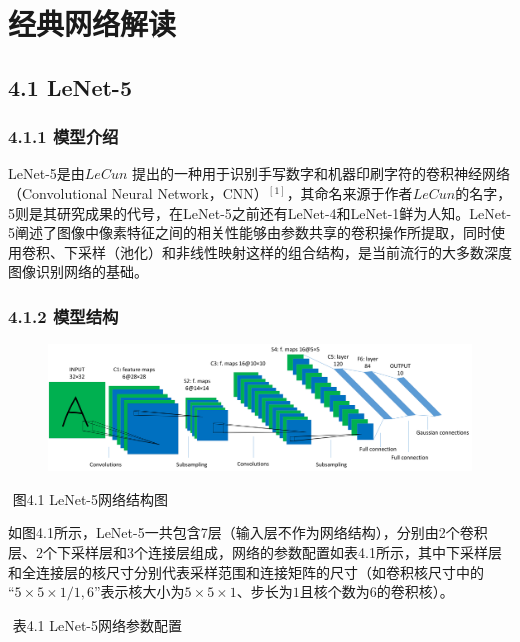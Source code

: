 \chapter{经典网络解读}\label{ux7b2cux56dbux7ae0-ux7ecfux5178ux7f51ux7edcux89e3ux8bfb}

\section{4.1 LeNet-5}\label{lenet-5}

\subsection{4.1.1 模型介绍}\label{ux6a21ux578bux4ecbux7ecd}

​ LeNet-5是由\(LeCun\)
提出的一种用于识别手写数字和机器印刷字符的卷积神经网络（Convolutional
Neural
Network，CNN）\(^{[1]}\)，其命名来源于作者\(LeCun\)的名字，5则是其研究成果的代号，在LeNet-5之前还有LeNet-4和LeNet-1鲜为人知。LeNet-5阐述了图像中像素特征之间的相关性能够由参数共享的卷积操作所提取，同时使用卷积、下采样（池化）和非线性映射这样的组合结构，是当前流行的大多数深度图像识别网络的基础。

\subsection{4.1.2 模型结构}\label{ux6a21ux578bux7ed3ux6784}

\begin{figure}
\centering
\includegraphics{./img/ch4/image1.png}
\caption{}
\end{figure}

​ 图4.1 LeNet-5网络结构图

​
如图4.1所示，LeNet-5一共包含7层（输入层不作为网络结构），分别由2个卷积层、2个下采样层和3个连接层组成，网络的参数配置如表4.1所示，其中下采样层和全连接层的核尺寸分别代表采样范围和连接矩阵的尺寸（如卷积核尺寸中的\(“5\times5\times1/1,6”\)表示核大小为\(5\times5\times1\)、步长为\(1​\)且核个数为6的卷积核）。

​ 表4.1 LeNet-5网络参数配置

